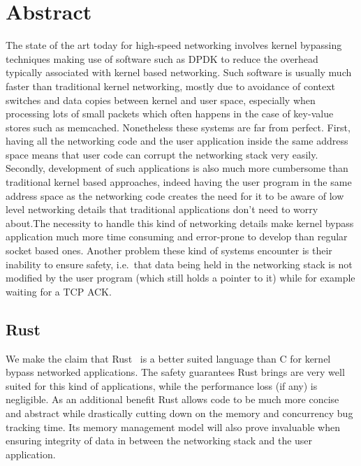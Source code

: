 \documentclass[11pt]{book}
\begin{document}
\tableofcontents

\listoftodos{}

\setcounter{page}{1}
\chapter{Abstract}

The state of the art today for high-speed networking involves kernel
bypassing techniques making use of software such as DPDK to reduce the
overhead typically associated with kernel based networking. Such
software is usually much faster than traditional kernel networking,
mostly due to avoidance of context switches and data copies between
kernel and user space, especially when processing lots of small
packets which often happens in the case of key-value stores such as
memcached. Nonetheless these systems are far from perfect. First,
having all the  networking code and the user application inside the
same address space means that user code can corrupt the networking
stack very easily. Secondly, development of such applications is also
much more cumbersome than traditional kernel based approaches, indeed
having the user program in the same address space as the networking
code creates the need for it to be aware of low level networking
details that traditional applications don't need to worry about.The
necessity to handle this kind of networking details make kernel bypass
application much more time consuming and error-prone to develop than
regular socket based ones. Another problem these kind of systems
encounter is their inability to ensure safety, i.e.\ that data being
held in the networking stack is not modified by the user program
(which still holds a pointer to it) while for example waiting for a
TCP ACK.

\section{Rust}

We make the claim that Rust~\cite{rustbook} is a better suited
language than C for kernel bypass networked applications. The safety
guarantees Rust brings are very well suited for this kind of
applications, while the performance loss (if any) is negligible. As an
additional benefit Rust allows code to be much more concise and
abstract while drastically cutting down on the memory and concurrency
bug tracking time. Its memory management model will also prove
invaluable when ensuring integrity of data in between the networking
stack and the user application.
\end{document}
